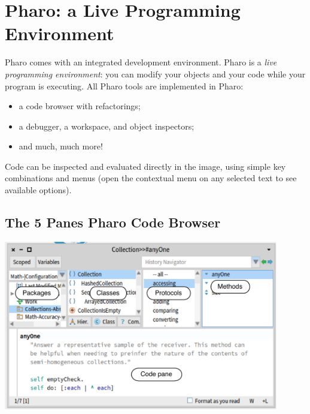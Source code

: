 \documentclass[notumble]{leaflet}
\begin{document}
\section{Pharo: a Live Programming Environment}

Pharo comes with an integrated development environment. Pharo
is a \emph{live programming environment}: you can modify your objects
and your code while your program is executing. All Pharo tools are
implemented in Pharo:
\begin{itemize}
\item a code browser with refactorings;
\item a debugger, a workspace, and object inspectors;
\item and much, much more!
\end{itemize}

Code can be inspected and evaluated directly in the image, using
simple key combinations and menus (open the contextual menu on any
selected text to see available options).


\subsection{The 5 Panes Pharo Code Browser}

\begin{center}
  \includegraphics[width=0.9\textwidth]{nautilus-anotated}
\end{center}
\end{document}
